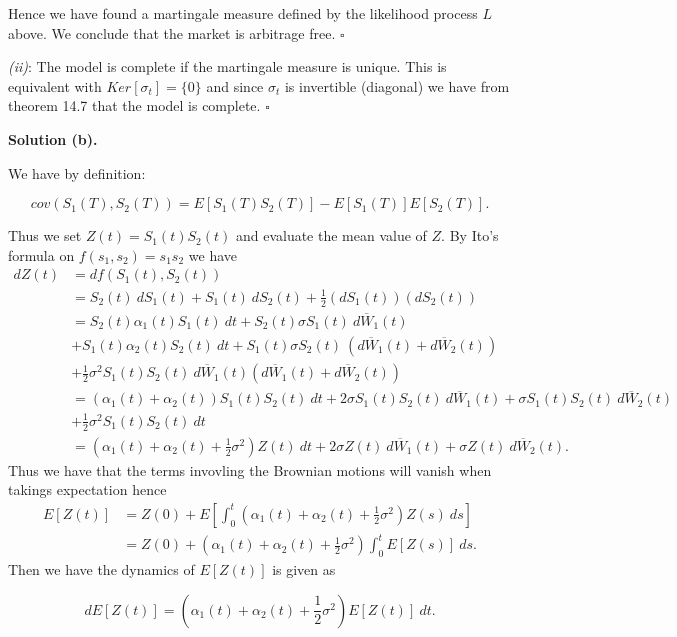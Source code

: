 \documentclass[a4paper,12pt,openany]{book}
\begin{document}
Hence we have found a martingale measure defined by the likelihood process \(L\) above. We conclude that the market is arbitrage free. \(\square\)

\emph{(ii)}: The model is complete if the martingale measure is unique. This is equivalent with \(Ker[\sigma_t]=\{0\}\) and since \(\sigma_t\) is invertible (diagonal) we have from theorem 14.7 that the model is complete. \(\square\)

\noindent\makebox[\linewidth]{\rule{\textwidth}{0.4pt}}

\textbf{Solution (b).}

We have by definition:

\[
cov(S_1(T),S_2(T))=E\left[S_1(T)S_2(T)\right]-E[S_1(T)]E[S_2(T)].
\]

Thus we set \(Z(t)=S_1(t)S_2(t)\) and evaluate the mean value of \(Z\). By Ito's formula on \(f(s_1,s_2)=s_1s_2\) we have
\begin{align*}
dZ(t)&=df(S_1(t),S_2(t))\\
&=S_2(t)\ dS_1(t)+S_1(t)\ dS_2(t)+\frac{1}{2}(dS_1(t))(dS_2(t))\\
&=S_2(t)\alpha_1(t) S_1(t)\ dt+S_2(t)\sigma S_1(t)\ d\overline{W}_1(t)\\
&+S_1(t)\alpha_2(t) S_2(t)\ dt+S_1(t)\sigma S_2(t)\ (d\overline{W}_1(t)+d\overline{W}_2(t))\\
&+\frac{1}{2}\sigma^2S_1(t)S_2(t)\ d\overline{W}_1(t)(d\overline{W}_1(t)+d\overline{W}_2(t))\\
&=(\alpha_1(t)+\alpha_2(t))S_1(t) S_2(t)\ dt+2\sigma S_1(t) S_2(t)\ d\overline{W}_1(t) + \sigma S_1(t) S_2(t)\ d\overline{W}_2(t)\\
&+\frac{1}{2}\sigma^2S_1(t)S_2(t)\ dt\\
&=(\alpha_1(t)+\alpha_2(t)+\frac{1}{2}\sigma^2)Z(t)\ dt+2\sigma Z(t)\ d\overline{W}_1(t) + \sigma Z(t)\ d\overline{W}_2(t).
\end{align*}
Thus we have that the terms invovling the Brownian motions will vanish when takings expectation hence
\begin{align*}
E[Z(t)]&=Z(0)+E\left[\int_0^t(\alpha_1(t)+\alpha_2(t)+\frac{1}{2}\sigma^2)Z(s)\ ds\right]\\
&=Z(0)+(\alpha_1(t)+\alpha_2(t)+\frac{1}{2}\sigma^2)\int_0^tE\left[Z(s)\right]\ ds.
\end{align*}
Then we have the dynamics of \(E[Z(t)]\) is given as

\[
dE[Z(t)]=(\alpha_1(t)+\alpha_2(t)+\frac{1}{2}\sigma^2)E\left[Z(t)\right]\ dt.
\]
\end{document}
